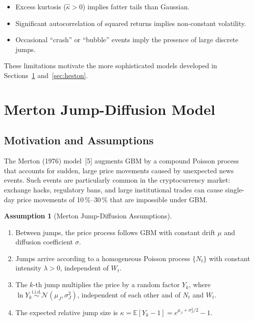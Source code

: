 \documentclass[12pt, a4paper, oneside]{report}
\theoremstyle{plain}
\theoremstyle{definition}
\newtheorem{assumption}[theorem]{Assumption}
\theoremstyle{remark}
\newcommand{\E}{\mathbb{E}}
\begin{document}
\begin{itemize}[leftmargin=1.25cm]
  \item Excess kurtosis ($\hat\kappa > 0$) implies fatter tails than Gaussian.
  \item Significant autocorrelation of squared returns implies non-constant volatility.
  \item Occasional ``crash'' or ``bubble'' events imply the presence of large discrete jumps.
\end{itemize}

These limitations motivate the more sophisticated models developed in
Sections~\ref{sec:merton} and~\ref{sec:heston}.

\section{Merton Jump-Diffusion Model}
\label{sec:merton}

\subsection{Motivation and Assumptions}

The Merton (1976) model~[5] augments GBM by a compound Poisson process that accounts
for sudden, large price movements caused by unexpected news events.  Such events are
particularly common in the cryptocurrency market: exchange hacks, regulatory bans, and
large institutional trades can cause single-day price movements of 10\,\%--30\,\% that
are impossible under GBM.

\begin{assumption}[Merton Jump-Diffusion Assumptions]
\label{ass:merton}
\begin{enumerate}[leftmargin=1.25cm, label=\textup{(M\arabic*)}]
  \item Between jumps, the price process follows GBM with constant drift $\mu$ and
    diffusion coefficient $\sigma$.
  \item Jumps arrive according to a homogeneous Poisson process $\{N_t\}$ with
    constant intensity $\lambda > 0$, independent of $W_t$.
  \item The $k$-th jump multiplies the price by a random factor $Y_k$, where
    $\ln Y_k \overset{\text{i.i.d.}}{\sim} \mathcal{N}(\mu_J, \sigma_J^2)$,
    independent of each other and of $N_t$ and $W_t$.
  \item The expected relative jump size is
    $\kappa = \E[Y_k - 1] = e^{\mu_J + \sigma_J^2/2} - 1$.
\end{enumerate}
\end{assumption}
\end{document}
